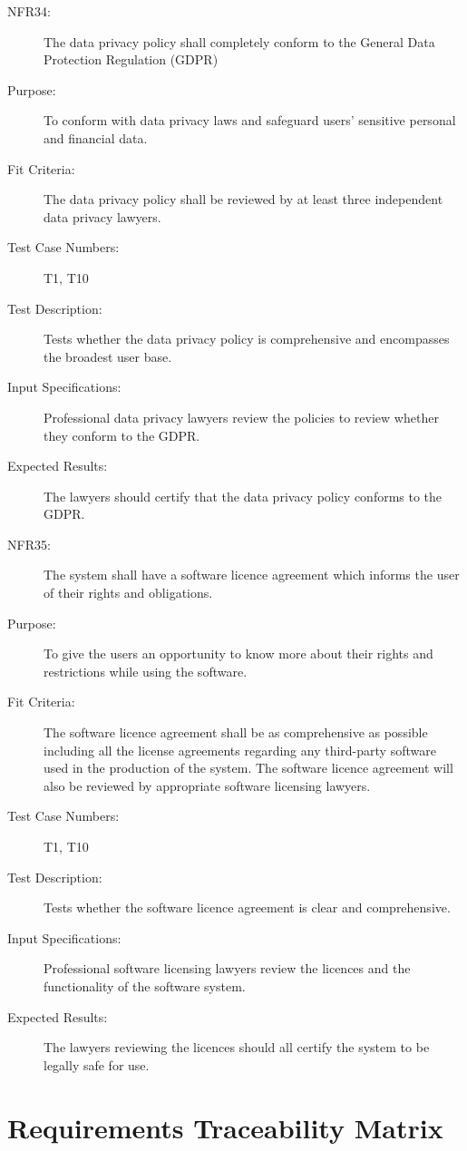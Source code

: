 \documentclass[a4paper,twoside,phd]{BYUPhys}
\begin{document}
\begin{description}
\item[NFR34:] The data privacy policy shall completely conform to the General Data Protection Regulation (GDPR)
\item[Purpose:] To conform with data privacy laws and safeguard users' sensitive personal and financial data.
\item[Fit Criteria:] The data privacy policy shall be reviewed by at least three independent data privacy lawyers. 
\item[Test Case Numbers:] T1, T10
\item[Test Description:] Tests whether the data privacy policy is comprehensive and encompasses the broadest user base.
\item[Input Specifications:] Professional data privacy lawyers review the policies to review whether they conform to the GDPR.
\item[Expected Results:] The lawyers should certify that the data privacy policy conforms to the GDPR.

\item[NFR35:] The system shall have a software licence agreement which informs the user of their rights and obligations.
\item[Purpose:] To give the users an opportunity to know more about their rights and restrictions while using the software.
\item[Fit Criteria:] The software licence agreement shall be as comprehensive as possible including all the license agreements regarding any third-party software used in the production of the system. The software licence agreement will also be reviewed by appropriate software licensing lawyers.
\item[Test Case Numbers:] T1, T10
\item[Test Description:] Tests whether the software licence agreement is clear and comprehensive.
\item[Input Specifications:] Professional software licensing lawyers review the licences and the functionality of the software system.
\item[Expected Results:] The lawyers reviewing the licences should all certify the system to be legally safe for use.
\end{description}

\section{Requirements Traceability Matrix}
\setlength{\arrayrulewidth}{0.2mm}
\setlength{\tabcolsep}{18pt}
\renewcommand{\arraystretch}{2.5}
 
\end{document}
